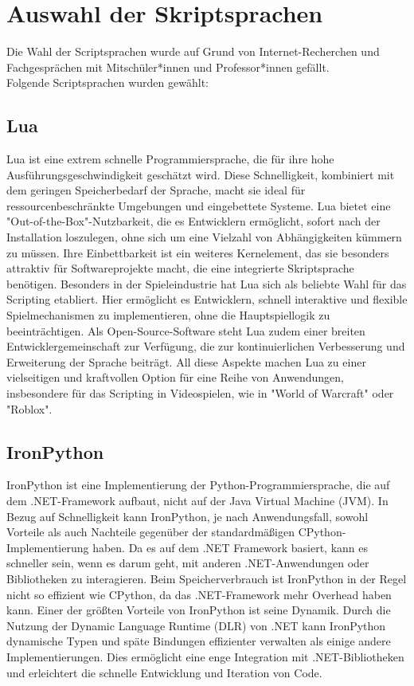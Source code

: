 \section{Auswahl der Skriptsprachen}

Die Wahl der Scriptsprachen wurde auf Grund von Internet-Recherchen 
und Fachgesprächen mit Mitschüler*innen und Professor*innen gefällt.\\
Folgende Scriptsprachen wurden gewählt:

\subsection{Lua}
Lua ist eine extrem schnelle Programmiersprache, die für ihre hohe Ausführungsgeschwindigkeit geschätzt wird. 
Diese Schnelligkeit, kombiniert mit dem geringen Speicherbedarf der Sprache, macht sie ideal für ressourcenbeschränkte Umgebungen und eingebettete Systeme. 
Lua bietet eine "Out-of-the-Box"-Nutzbarkeit, die es Entwicklern ermöglicht, sofort nach der Installation loszulegen, ohne sich um eine Vielzahl von Abhängigkeiten kümmern zu müssen. 
Ihre Einbettbarkeit ist ein weiteres Kernelement, das sie besonders attraktiv für Softwareprojekte macht, die eine integrierte Skriptsprache benötigen. Besonders in der Spieleindustrie hat Lua sich als beliebte Wahl für das Scripting etabliert. Hier ermöglicht es Entwicklern, schnell interaktive und flexible Spielmechanismen zu implementieren, ohne die Hauptspiellogik zu beeinträchtigen. 
Als Open-Source-Software steht Lua zudem einer breiten Entwicklergemeinschaft zur Verfügung, die zur kontinuierlichen Verbesserung und Erweiterung der Sprache beiträgt.
All diese Aspekte machen Lua zu einer vielseitigen und kraftvollen Option für eine Reihe von Anwendungen, insbesondere für das Scripting in Videospielen, wie in "World of Warcraft" oder "Roblox".

\newpage
\subsection{IronPython}
IronPython ist eine Implementierung der Python-Programmiersprache, die auf dem .NET-Framework aufbaut, nicht auf der Java Virtual Machine (JVM). 
In Bezug auf Schnelligkeit kann IronPython, je nach Anwendungsfall, sowohl Vorteile als auch Nachteile gegenüber der standardmäßigen CPython-Implementierung haben. 
Da es auf dem .NET Framework basiert, kann es schneller sein, wenn es darum geht, mit anderen .NET-Anwendungen oder Bibliotheken zu interagieren. 
Beim Speicherverbrauch ist IronPython in der Regel nicht so effizient wie CPython, da das .NET-Framework mehr Overhead haben kann. 
Einer der größten Vorteile von IronPython ist seine Dynamik. 
Durch die Nutzung der Dynamic Language Runtime (DLR) von .NET kann IronPython dynamische Typen und späte Bindungen effizienter verwalten als einige andere Implementierungen. 
Dies ermöglicht eine enge Integration mit .NET-Bibliotheken und erleichtert die schnelle Entwicklung und Iteration von Code.

